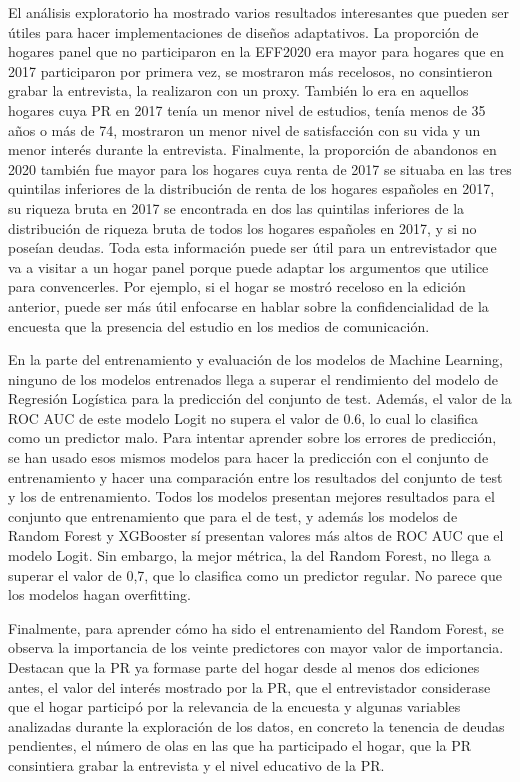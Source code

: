 El análisis exploratorio ha mostrado varios resultados interesantes que pueden ser útiles para hacer implementaciones de diseños adaptativos. La proporción de hogares panel que no participaron en la EFF2020 era mayor para hogares que en 2017 participaron por primera vez, se mostraron más recelosos, no consintieron grabar la entrevista, la realizaron con un proxy. También lo era en aquellos hogares cuya PR en 2017 tenía un menor nivel de estudios, tenía menos de 35 años o más de 74, mostraron un menor nivel de satisfacción con su vida y un menor interés durante la entrevista. Finalmente, la proporción de abandonos en 2020 también fue mayor para los hogares cuya renta de 2017 se situaba en las tres quintilas inferiores de la distribución de renta de los hogares españoles en 2017, su riqueza bruta en 2017 se encontrada en dos las quintilas inferiores de la distribución de riqueza bruta de todos los hogares españoles en 2017, y si no poseían deudas. Toda esta información puede ser útil para un entrevistador que va a visitar a un hogar panel porque puede adaptar los argumentos que utilice para convencerles. Por ejemplo, si el hogar se mostró receloso en la edición anterior, puede ser más útil enfocarse en hablar sobre la confidencialidad de la encuesta que la presencia del estudio en los medios de comunicación.

En la parte del entrenamiento y evaluación de los modelos de Machine Learning, ninguno de los modelos entrenados llega a superar el rendimiento del modelo de Regresión Logística para la predicción del conjunto de test. Además, el valor de la ROC AUC de este modelo Logit no supera el valor de 0.6, lo cual lo clasifica como un predictor malo. Para intentar aprender sobre los errores de predicción, se han usado esos mismos modelos para hacer la predicción con el conjunto de entrenamiento y hacer una comparación entre los resultados del conjunto de test y los de entrenamiento. Todos los modelos presentan mejores resultados para el conjunto que entrenamiento que para el de test, y además los modelos de Random Forest y XGBooster sí presentan valores más altos de ROC AUC que el modelo Logit. Sin embargo, la mejor métrica, la del Random Forest, no llega a superar el valor de 0,7, que lo clasifica como un predictor regular. No parece que los modelos hagan overfitting.

Finalmente, para aprender cómo ha sido el entrenamiento del Random Forest, se observa la importancia de los veinte predictores con mayor valor de importancia. Destacan que la PR ya formase parte del hogar desde al menos dos ediciones antes, el valor del interés mostrado por la PR, que el entrevistador considerase que el hogar participó por la relevancia de la encuesta y algunas variables analizadas durante la exploración de los datos, en concreto la tenencia de deudas pendientes, el número de olas en las que ha participado el hogar, que la PR consintiera grabar la entrevista y el nivel educativo de la PR.

